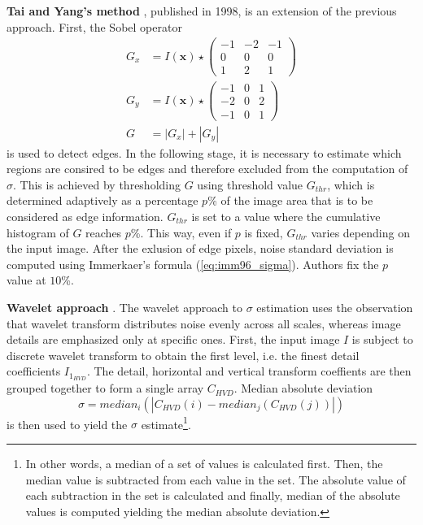 \documentclass[12pt,notitlepage]{report}
\begin{document}
\noindent \textbf{Tai and Yang's method} \cite{tai08}, published in 1998, is an extension of the previous approach. First, the Sobel operator
\begin{equation}
\label{eq:tai08_sobel}
\begin{aligned}
	G_x &= I(\mathbf{x}) \star \begin{pmatrix} -1 & -2 & - 1 \\ 0 & 0 & 0 \\ 1 & 2 & 1 \end{pmatrix} \\
	G_y &= I(\mathbf{x}) \star \begin{pmatrix} -1 & 0 & 1 \\ -2 & 0 & 2 \\ -1 & 0 & 1 \end{pmatrix} \\
	G &= |G_x| + |G_y|
\end{aligned}
\end{equation}
is used to detect edges. In the following stage, it is necessary to estimate which regions are consired to be edges and therefore excluded from the computation of $\sigma$. This is achieved by thresholding $G$ using threshold value $G_{thr}$, which is determined adaptively as a percentage $p$\% of the image area that is to be considered as edge information. $G_{thr}$ is set to a value where the cumulative histogram of $G$ reaches $p$\%. This way, even if $p$ is fixed, $G_{thr}$ varies depending on the input image. After the exlusion of edge pixels, noise standard deviation is computed using Immerkaer's formula (\ref{eq:imm96_sigma}). Authors fix the $p$ value at $10$\%. 

\noindent \textbf{Wavelet approach} \cite{mall09}. The wavelet approach to $\sigma$ estimation uses the observation that wavelet transform distributes noise evenly across all scales, whereas image details are emphasized only at specific ones. First, the input image $I$ is subject to discrete wavelet transform to obtain the first level, i.e. the finest detail coefficients $I_{1_{HVD}}$. The detail, horizontal and vertical transform coeffients are then grouped together to form a single array $C_{HVD}$. Median absolute deviation 
\begin{equation}
\label{eq:mall09_sigma}
	\sigma = median_i( | C_{HVD}(i) - median_j(C_{HVD}(j))|)
\end{equation}
is then used to yield the $\sigma$ estimate\footnote[3]{In other words, a median of a set of values is calculated first. Then, the median value is subtracted from each value in the set. The absolute value of each subtraction  in the set is calculated and finally, median of the absolute values is computed yielding the median absolute deviation.}.  
\end{document}
